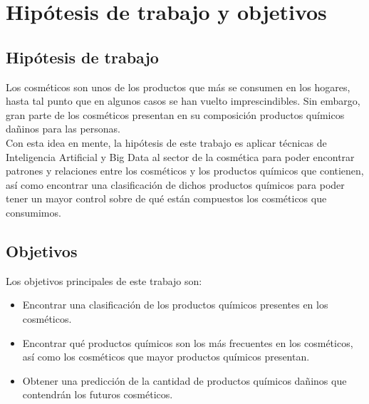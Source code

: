 
\chapter{Hipótesis de trabajo y objetivos} %
\label{chap:job-hypothesis} %


\section{Hipótesis de trabajo}
Los cosméticos son unos de los productos que más se consumen en los hogares, hasta tal punto que en algunos casos se han vuelto imprescindibles. Sin embargo, gran parte de los cosméticos presentan en su composición productos químicos dañinos para las personas. \\

Con esta idea en mente, la hipótesis de este trabajo es aplicar técnicas de Inteligencia Artificial y Big Data al sector de la cosmética para poder encontrar patrones y relaciones entre los cosméticos y los productos químicos que contienen, así como encontrar una clasificación de dichos productos químicos para poder tener un mayor control sobre de qué están compuestos los cosméticos que consumimos. \\




\section{Objetivos}
Los objetivos principales de este trabajo son:
\begin{itemize}
 \item Encontrar una clasificación de los productos químicos presentes en los cosméticos.
 \item Encontrar qué productos químicos son los más frecuentes en los cosméticos, así como los cosméticos que mayor productos químicos presentan.
 \item Obtener una predicción de la cantidad de productos químicos dañinos que contendrán los futuros cosméticos.
\end{itemize}

























